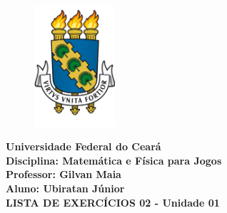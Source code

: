 \documentclass{abntex2}
\begin{document}
  \begin{center}
    \begin{figure}[h]
      \centering
      \includegraphics[width=3cm]{logo-ufc.PNG}
    \end{figure}
    \textbf{
      Universidade Federal do Ceará\\
      Disciplina: Matemática e Física para Jogos \\
      Professor: Gilvan Maia \\
      Aluno: Ubiratan Júnior \\
      LISTA DE EXERCÍCIOS 02 - Unidade 01
    }
  \end{center}
\end{document}
